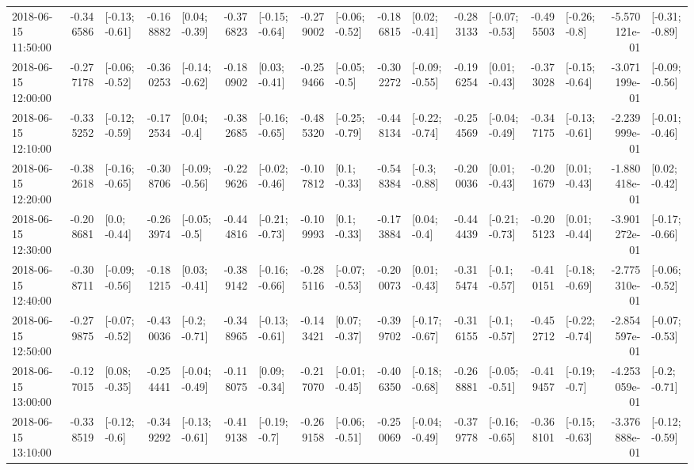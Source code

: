 \begin{tabular}{lrlrlrlrlrlrlrlrl}
2018-06-15 11:50:00 & -0.346586 &  [-0.13; -0.61] & -0.168882 &   [0.04; -0.39] & -0.376823 &  [-0.15; -0.64] & -0.279002 &  [-0.06; -0.52] & -0.186815 &   [0.02; -0.41] & -0.283133 &  [-0.07; -0.53] & -0.495503 &   [-0.26; -0.8] & -5.570121e-01 &  [-0.31; -0.89] \\
2018-06-15 12:00:00 & -0.277178 &  [-0.06; -0.52] & -0.360253 &  [-0.14; -0.62] & -0.180902 &   [0.03; -0.41] & -0.259466 &   [-0.05; -0.5] & -0.302272 &  [-0.09; -0.55] & -0.196254 &   [0.01; -0.43] & -0.373028 &  [-0.15; -0.64] & -3.071199e-01 &  [-0.09; -0.56] \\
2018-06-15 12:10:00 & -0.335252 &  [-0.12; -0.59] & -0.172534 &    [0.04; -0.4] & -0.382685 &  [-0.16; -0.65] & -0.485320 &  [-0.25; -0.79] & -0.448134 &  [-0.22; -0.74] & -0.254569 &  [-0.04; -0.49] & -0.347175 &  [-0.13; -0.61] & -2.239999e-01 &  [-0.01; -0.46] \\
2018-06-15 12:20:00 & -0.382618 &  [-0.16; -0.65] & -0.308706 &  [-0.09; -0.56] & -0.229626 &  [-0.02; -0.46] & -0.107812 &    [0.1; -0.33] & -0.548384 &   [-0.3; -0.88] & -0.200036 &   [0.01; -0.43] & -0.201679 &   [0.01; -0.43] & -1.880418e-01 &   [0.02; -0.42] \\
2018-06-15 12:30:00 & -0.208681 &    [0.0; -0.44] & -0.263974 &   [-0.05; -0.5] & -0.444816 &  [-0.21; -0.73] & -0.109993 &    [0.1; -0.33] & -0.173884 &    [0.04; -0.4] & -0.444439 &  [-0.21; -0.73] & -0.205123 &   [0.01; -0.44] & -3.901272e-01 &  [-0.17; -0.66] \\
2018-06-15 12:40:00 & -0.308711 &  [-0.09; -0.56] & -0.181215 &   [0.03; -0.41] & -0.389142 &  [-0.16; -0.66] & -0.285116 &  [-0.07; -0.53] & -0.200073 &   [0.01; -0.43] & -0.315474 &   [-0.1; -0.57] & -0.410151 &  [-0.18; -0.69] & -2.775310e-01 &  [-0.06; -0.52] \\
2018-06-15 12:50:00 & -0.279875 &  [-0.07; -0.52] & -0.430036 &   [-0.2; -0.71] & -0.348965 &  [-0.13; -0.61] & -0.143421 &   [0.07; -0.37] & -0.399702 &  [-0.17; -0.67] & -0.316155 &   [-0.1; -0.57] & -0.452712 &  [-0.22; -0.74] & -2.854597e-01 &  [-0.07; -0.53] \\
2018-06-15 13:00:00 & -0.127015 &   [0.08; -0.35] & -0.254441 &  [-0.04; -0.49] & -0.118075 &   [0.09; -0.34] & -0.217070 &  [-0.01; -0.45] & -0.406350 &  [-0.18; -0.68] & -0.268881 &  [-0.05; -0.51] & -0.419457 &   [-0.19; -0.7] & -4.253059e-01 &   [-0.2; -0.71] \\
2018-06-15 13:10:00 & -0.338519 &   [-0.12; -0.6] & -0.349292 &  [-0.13; -0.61] & -0.419138 &   [-0.19; -0.7] & -0.269158 &  [-0.06; -0.51] & -0.250069 &  [-0.04; -0.49] & -0.379778 &  [-0.16; -0.65] & -0.368101 &  [-0.15; -0.63] & -3.376888e-01 &  [-0.12; -0.59] \\

\end{tabular}
